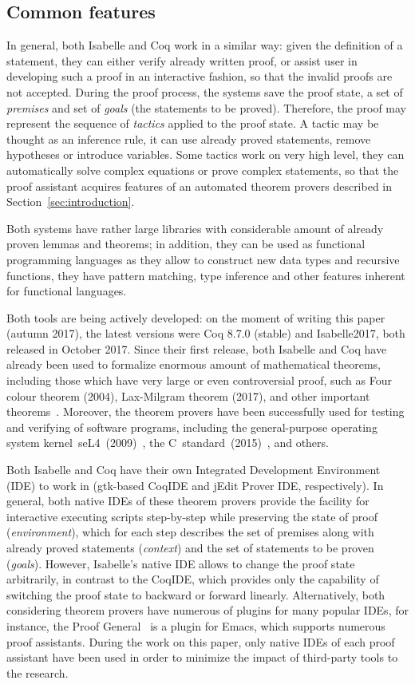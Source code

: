 \documentclass[article]{aaltoseries}
\begin{document}
\subsection{Common features}

In general, both Isabelle and Coq work in a similar way: given the definition of a statement, they can either verify already written proof, or assist user in developing such a proof in an interactive fashion, so that the invalid proofs are not accepted.
During the proof process, the systems save the proof state, a set of \textit{premises} and set of \textit{goals} (the statements to be proved). Therefore, the proof may represent the sequence of \textit{tactics} applied to the proof state. A tactic may be thought as an inference rule, it can use already proved statements, remove hypotheses or introduce variables. Some tactics work on very high level, they can automatically solve complex equations or prove complex statements, so that the proof assistant acquires features of an automated theorem provers described in Section~\ref{sec:introduction}.

Both systems have rather large libraries with considerable amount of already proven lemmas and theorems; in addition, they can be used as functional programming languages as they allow to construct new data types and recursive functions, they have pattern matching, type inference and other features inherent for functional languages.

Both tools are being actively developed: on the moment of writing this paper (autumn 2017), the latest versions were Coq 8.7.0 (stable) and Isabelle2017, both released in October 2017. Since their first release, both Isabelle and Coq have already been used to formalize enormous amount of mathematical theorems, including those which have very large or even controversial proof, such as Four colour theorem (2004), Lax-Milgram theorem (2017), and other important theorems~\cite{Wiedijk100}. Moreover, the theorem provers have been successfully used for testing and verifying of software programs, including the general-purpose operating system kernel~seL4~(2009)~\cite{Klein09}, the C~standard~(2015)~\cite{Krebbers15}, and others.

Both Isabelle and Coq have their own Integrated Development Environment (IDE) to work in (gtk-based CoqIDE and jEdit Prover IDE, respectively). In general, both native IDEs of these theorem provers provide the facility for interactive executing scripts step-by-step while preserving the state of proof (\textit{environment}), which for each step describes the set of premises along with already proved statements (\textit{context}) and the set of statements to be proven (\textit{goals}). However, Isabelle's native IDE allows to change the proof state arbitrarily, in contrast to the CoqIDE, which provides only the capability of switching the proof state to backward or forward linearly. Alternatively, both considering theorem provers have numerous of plugins for many popular IDEs, for instance, the Proof General~\cite{tool_PG} is a plugin for Emacs, which supports numerous proof assistants. During the work on this paper, only native IDEs of each proof assistant have been used in order to minimize the impact of third-party tools to the research.
\end{document}
